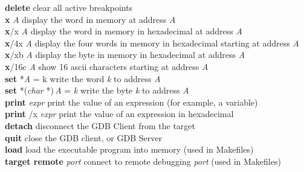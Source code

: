\documentclass[11pt, twoside, pdftex]{article}
\newcommand{\commonPath}{../../Common}
\begin{document}
\begin{tabbing}
{\bf delete} \>clear all active breakpoints\\
{\bf x} {\it A} \>display the word in memory at address {\it A}\\
{\bf x}/x {\it A} \>display the word in memory in hexadecimal at address {\it A}\\
{\bf x}/4x {\it A} \>display the four words in memory in hexadecimal starting at address {\it A}\\
{\bf x}/xb {\it A} \>display the byte in memory in hexadecimal at address {\it A}\\
{\bf x}/16c {\it A} \>show 16 ascii characters starting at address {\it A}\\
{\bf set} *{\it A} = k \> write the word {\it k} to address {\it A}\\
{\bf set} *({\it char} *)$\,${\it A} = {\it k} \> write the byte {\it k} to address {\it A}\\
{\bf print} {\it expr} \>print the value of an expression (for example, a variable)\\
{\bf print} /x {\it expr} \>print the value of an expression in hexadecimal\\
{\bf detach} \>disconnect the GDB Client from the target\\
{\bf quit} \>close the GDB client, or GDB Server\\
{\bf load} \>load the executable program into memory (used in Makefiles)\\
{\bf target remote} {\it port} \>connect to remote debugging {\it port} (used in Makefiles)
\end{tabbing}



\end{document}
